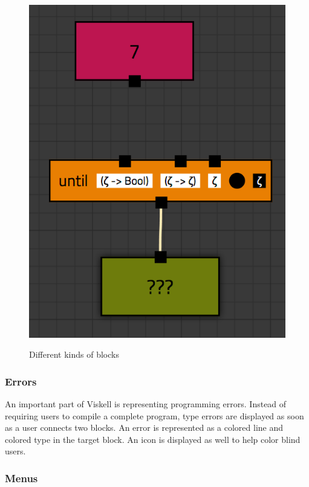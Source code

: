 \begin{figure}[p]
	\centering
	\includegraphics[scale=0.5]{Images/blocks-example}
	\label{fig:blocks-example}
	\caption{Different kinds of blocks}
\end{figure}

\subsubsection{Errors}

An important part of Viskell is representing programming errors.
Instead of requiring users to compile a complete program, type errors are displayed as soon as a user connects two blocks.
An error is represented as a colored line and colored type in the target block.
An icon is displayed as well to help color blind users.

\subsubsection{Menus}

